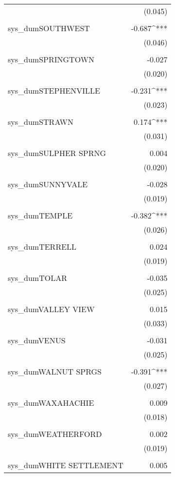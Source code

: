 \begin{table}[!htbp]
\begin{tabular}{@{\extracolsep{5pt}}lD{.}{.}{-3} }
  & (0.045) \\ 
  & \\ 
 sys\_dumSOUTHWEST & -0.687^{***} \\ 
  & (0.046) \\ 
  & \\ 
 sys\_dumSPRINGTOWN & -0.027 \\ 
  & (0.020) \\ 
  & \\ 
 sys\_dumSTEPHENVILLE & -0.231^{***} \\ 
  & (0.023) \\ 
  & \\ 
 sys\_dumSTRAWN & 0.174^{***} \\ 
  & (0.031) \\ 
  & \\ 
 sys\_dumSULPHER SPRNG & 0.004 \\ 
  & (0.020) \\ 
  & \\ 
 sys\_dumSUNNYVALE & -0.028 \\ 
  & (0.019) \\ 
  & \\ 
 sys\_dumTEMPLE & -0.382^{***} \\ 
  & (0.026) \\ 
  & \\ 
 sys\_dumTERRELL & 0.024 \\ 
  & (0.019) \\ 
  & \\ 
 sys\_dumTOLAR & -0.035 \\ 
  & (0.025) \\ 
  & \\ 
 sys\_dumVALLEY VIEW & 0.015 \\ 
  & (0.033) \\ 
  & \\ 
 sys\_dumVENUS & -0.031 \\ 
  & (0.025) \\ 
  & \\ 
 sys\_dumWALNUT SPRGS & -0.391^{***} \\ 
  & (0.027) \\ 
  & \\ 
 sys\_dumWAXAHACHIE & 0.009 \\ 
  & (0.018) \\ 
  & \\ 
 sys\_dumWEATHERFORD & 0.002 \\ 
  & (0.019) \\ 
  & \\ 
 sys\_dumWHITE SETTLEMENT & 0.005 \\ 

\end{tabular}
\end{table}
